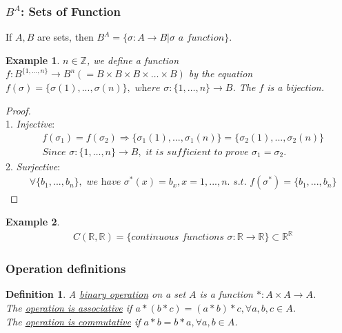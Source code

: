 \documentclass[11pt,a4paper]{article}
\newtheorem{example}{Example}
\newtheorem{definition}{Definition}
\begin{document}
\subsubsection{$B^A$: Sets of Function}
If $A,B$ are sets, then $B^A=\{\sigma:A \rightarrow B| \sigma \textit{ a function}\}$.
\begin{example}
    $n\in \mathbb{Z}$, we define a function $f: B^{\{1,\dots,n\}} \rightarrow B^n(=B\times B\times B\times \dots \times B)$ by the equation
    $f(\sigma)=\{\sigma(1),...,\sigma(n)\}, \textit{ where }\sigma:\{1,\dots,n\} \rightarrow B$. The $f$ is a \textit{bijection}.
\end{example}
\begin{proof}
    \quad\\
    1. \textit{Injective}:
    \begin{equation}
        \begin{aligned}
            &f(\sigma_1)=f(\sigma_2)
            \Rightarrow \{\sigma_1(1),...,\sigma_1(n)\}=\{\sigma_2(1),...,\sigma_2(n)\}\\
            &\textit{Since }\sigma:\{1,\dots,n\} \rightarrow B,\textit{ it is sufficient to prove }\sigma_1=\sigma_2.
        \end{aligned}
        \nonumber
    \end{equation}
    2. \textit{Surjective}:
    \begin{equation}
        \begin{aligned}
            &\forall \{b_1,...,b_n\},\textit{ we have }\sigma^*(x)=b_x,x=1,...,n.\textit{ s.t. }f(\sigma^*)=\{b_1,...,b_n\}
        \end{aligned}
        \nonumber
    \end{equation}

\end{proof}
\begin{example}
    \begin{equation}
        \begin{aligned}
            & C(\mathbb{R},\mathbb{R})=\{\textit{continuous functions }\sigma:\mathbb{R} \rightarrow \mathbb{R} \}\subset \mathbb{R}^\mathbb{R}
        \end{aligned}
        \nonumber
    \end{equation}
\end{example}

\subsubsection{Operation definitions}
\begin{definition}
    A \underline{binary operation} on a set $A$ is a function $*:A\times A \rightarrow A$.\\
    The \underline{operation is \textit{associative}} if $a*(b*c)=(a*b)*c, \forall a,b,c\in A$.\\
    The \underline{operation is \textit{commutative}} if $a*b=b*a, \forall a,b\in A$.
\end{definition}
\end{document}
